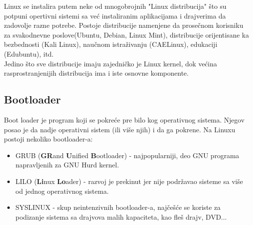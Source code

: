 Linux se instalira putem neke od mnogobrojnih "Linux distribucija" što su potpuni opertivni sistemi sa već instaliranim aplikacijama i  drajverima da zadovolje razne potrebe. Postoje distribucije namenjene da prosečnom korisniku za svakodnevne poslove(Ubuntu, Debian, Linux Mint), distribucije orijentisane ka bezbednosti (Kali Linux), naučnom istraživanju (CAELinux), edukaciji (Edubuntu), itd.\\
Jedino što sve distribucije imaju zajedničko je Linux kernel, dok većina rasprostranjenijih distribucija ima i iste osnovne komponente.


\subsection{Bootloader}
Boot loader je program koji se pokreće pre bilo kog operativnog sistema. Njegov posao je da nadje operativni sistem (ili više njih) i da ga pokrene. Na Linuxu postoji nekoliko bootloader-a:\begin{itemize}
\item GRUB (\textbf{GR}and \textbf{U}nified \textbf{B}ootloader) - najpopularniji, deo GNU programa napravljenih za GNU Hurd kernel.
\item LILO (\textbf{Li}nux \textbf{Lo}ader) - razvoj je prekinut jer nije podržavao sisteme sa više od jednog operativnog sistema.
\item SYSLINUX - skup neintenzivnih bootloader-a, najčešće se koriste za podizanje sistema sa drajvova malih kapaciteta, kao fleš drajv, DVD...
\end{itemize}

